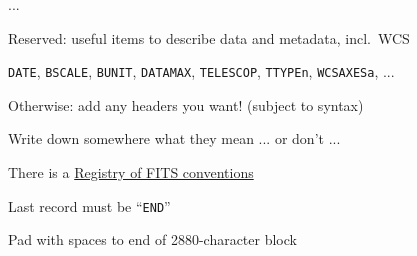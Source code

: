 \documentclass[20pt,landscape]{foils}
\newcommand{\bhref}[2]{\href{#1}{{\color{blue}#2}}}
\begin{document}
\begin{list0}
\begin{list2big}
\begin{list3}
\begin{list4}
                ...
\vspace*{-0.15cm}
      \end{list4}
      \item Reserved: useful items to describe data and metadata, incl.\ WCS
      \begin{list4}
        \item[] {\color{brown}\tt DATE},
                {\color{brown}\tt BSCALE},
                {\color{brown}\tt BUNIT},
                {\color{brown}\tt DATAMAX},
                {\color{brown}\tt TELESCOP},
                {\color{brown}\tt TTYPEn},
                {\color{brown}\tt WCSAXESa}, ...
\vspace*{-0.15cm}
      \end{list4}
      \item Otherwise: add any headers you want! (subject to syntax)
      \begin{list4}
        \item Write down somewhere what they mean ... or don't ...
        \item There is a
              \bhref{https://fits.gsfc.nasa.gov/fits_conventions.html}
                    {Registry of FITS conventions}
\vspace*{-0.15cm}
      \end{list4}
\vspace*{-0.15cm}
    \end{list3}
\vspace*{-0.15cm}
    \item Last record must be ``{\color{brown}\tt END}''
\vspace*{-0.15cm}
    \item Pad with spaces to end of 2880-character block
\vspace*{-0.15cm}
  \end{list2big}
\end{list0}

\newcommand{\g}{\color{darkgreen}}

\end{document}
